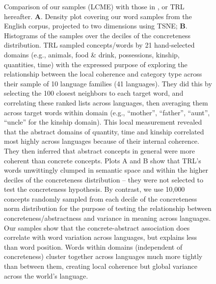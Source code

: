 \documentclass[9pt,twoside,lineno]{pnas-new}
\begin{document}
\begin{figure}[h]
         \caption{Comparison of our samples (LCME) with those in \cite{thompson2020cultural}, or TRL hereafter. \textbf{A}. Density plot covering our word samples from the English corpus, projected to two dimensions using TSNE; \textbf{B}. Histograms of the samples over the deciles of the concreteness distribution. TRL sampled concepts/words by 21 hand-selected domains (e.g., animals, food \& drink, possessions, kinship, quantities, time) with the expressed purpose of exploring the relationship between the local coherence and category type across their sample of 10 language families (41 languages). They did this by selecting the 100 closest neighbors to each target word, and correlating these ranked lists across languages, then averaging them across target words within domain (e.g., “mother”, “father”, “aunt”, “uncle” for the kinship domain). This local measurement revealed that the abstract domains of quantity, time and kinship correlated most highly across languages because of their internal coherence. They then inferred that abstract concepts in general were more coherent than concrete concepts. Plots A and B show that TRL's words unwittingly clumped in semantic space and within the higher deciles of the concreteness distribution -- they were not selected to test the concreteness hypothesis. By contrast, we use 10,000 concepts randomly sampled from each decile of the concreteness norm distribution for the purpose of testing the relationship between concreteness/abstractness and variance in meaning across languages. Our samples show that the concrete-abstract association does correlate with word variation across languages, but explains less than word position. Words within domains (independent of concreteness) cluster together across languages much more tightly than between them, creating local coherence but global variance across the world's language.}
\end{figure}

\pagebreak
\clearpage


\end{document}

